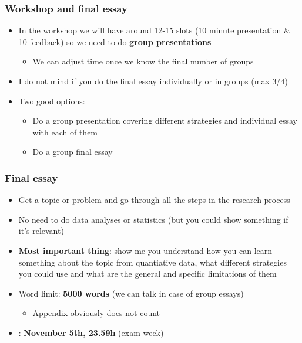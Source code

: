 \documentclass[aspectratio=43]{beamer}
\begin{document}
\begin{frame}
\frametitle{Workshop and final essay}
\centering

\begin{itemize}
  \item In the workshop we will have around 12-15 slots (10 minute presentation \& 10 feedback) so we need to do \textbf{group presentations}
  \begin{itemize}
    \item We can adjust time once we know the final number of groups
  \end{itemize}
  \item I do not mind if you do the final essay individually or in groups (max 3/4)
  \item Two good options:
  \begin{itemize}
    \item Do a group presentation covering different strategies and individual essay with each of them
    \item Do a group final essay
  \end{itemize}
\end{itemize}

\end{frame}

\begin{frame}
\frametitle{Final essay}
\centering

\begin{itemize}
  \item Get a topic or problem and go through all the steps in the research process
  \item No need to do data analyses or statistics (but you could show something if it's relevant)
  \item \textbf{Most important thing}: show me you understand how you can learn something about the topic from quantiative data, what different strategies you could use and what are the general and specific limitations of them
  \item Word limit: \textbf{5000 words} (we can talk in case of group essays)
  \begin{itemize}
    \item Appendix obviously does not count
  \end{itemize}
  \item {\color{red}{Deadline}}: \textbf{November 5th, 23.59h} (exam week)
\end{itemize}

\end{frame}
\end{document}
